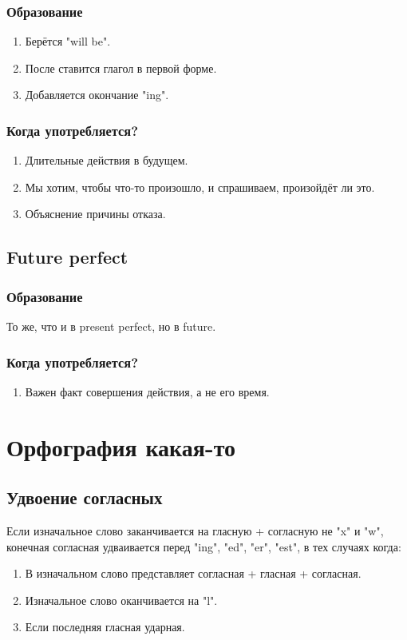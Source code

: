 \documentclass[oneside]{book}
\begin{document}
    \subsection{Образование}
    \begin{enumerate}
        \item Берётся "will be".
        \item После ставится глагол в первой форме.
        \item Добавляется окончание "ing".
    \end{enumerate}

    \subsection{Когда употребляется?}
    \begin{enumerate}
        \item Длительные действия в будущем.
        \item Мы хотим, чтобы что-то произошло, и спрашиваем, произойдёт ли это.
        \item Объяснение причины отказа.
    \end{enumerate}

    \section{Future perfect}
    \subsection{Образование}
    То же, что и в present perfect, но в future.

    \subsection{Когда употребляется?}
    \begin{enumerate}
        \item Важен факт совершения действия, а не его время.
    \end{enumerate}

    \chapter{Орфография какая-то}
    \section{Удвоение согласных}
    Если изначальное слово заканчивается на гласную + согласную не "x"{ }и "w", конечная
    согласная удваивается перед "ing"{}, "ed"{}, "er"{}, "est"{},
    в тех случаях когда:
    \begin{enumerate}
        \item В изначальном слово представляет согласная + гласная + согласная.
        \item Изначальное слово оканчивается на "l".
        \item Если последняя гласная ударная.
    \end{enumerate}
\end{document}

